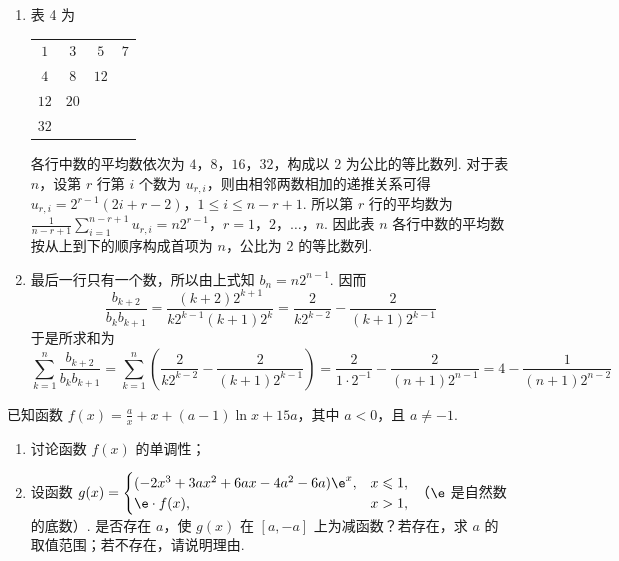 \begin{solution}
\begin{enumerate}
\item 表 4 为
\begin{center}
\begin{tabular}{cccc}
\(1\) & \(3\) & \(5\) & \(7\) \\
\(4\) & \(8\) & \(12\) & \\
\(12\) & \(20\) & & \\
\(32\) & & &
\end{tabular}
\end{center}
各行中数的平均数依次为 \(4\)，\(8\)，\(16\)，\(32\)，构成以 \(2\) 为公比的等比数列. 对于表 \(n\)，设第 \(r\) 行第 \(i\) 个数为 \(u_{r,i}\)，则由相邻两数相加的递推关系可得
\(u_{r,i}=2^{r-1}(2i+r-2)\)，\(1\leqslant i\leqslant n-r+1\).
所以第 \(r\) 行的平均数为
\(\frac{1}{n-r+1}\sum_{i=1}^{n-r+1}u_{r,i}=n2^{r-1}\)，\(r=1\)，\(2\)，\(\ldots\)，\(n\).
因此表 \(n\) 各行中数的平均数按从上到下的顺序构成首项为 \(n\)，公比为 \(2\) 的等比数列.
\item 最后一行只有一个数，所以由上式知 \(b_n=n2^{n-1}\). 因而
\[
\frac{b_{k+2}}{b_kb_{k+1}}=\frac{(k+2)2^{k+1}}{k2^{k-1}(k+1)2^k}=\frac{2}{k2^{k-2}}-\frac{2}{(k+1)2^{k-1}}
\]
于是所求和为
\[
\sum_{k=1}^{n}\frac{b_{k+2}}{b_kb_{k+1}}=\sum_{k=1}^{n}\left(\frac{2}{k2^{k-2}}-\frac{2}{(k+1)2^{k-1}}\right)=\frac{2}{1\cdot2^{-1}}-\frac{2}{(n+1)2^{n-1}}=4-\frac{1}{(n+1)2^{n-2}}
\]
\end{enumerate}
\end{solution}

\begin{problem}
已知函数 \( f(x) = \frac{a}{x} + x + (a - 1)\ln x + 15a \)，其中 \( a < 0 \)，且 \( a \neq -1 \).
\begin{enumerate}
\item 讨论函数 \( f(x) \) 的单调性；
\item 设函数 \( g(x) = \begin{cases}
(-2x^3 + 3ax^2 + 6ax - 4a^2 - 6a)\e^x, & x \leqslant 1,\\
\e \cdot f(x), & x > 1,
\end{cases} \) （\(\e\) 是自然数的底数）. 是否存在 \(a\)，使 \(g(x)\) 在 \([a, -a]\) 上为减函数？若存在，求 \(a\) 的取值范围；若不存在，请说明理由.
\end{enumerate}
\end{problem}

